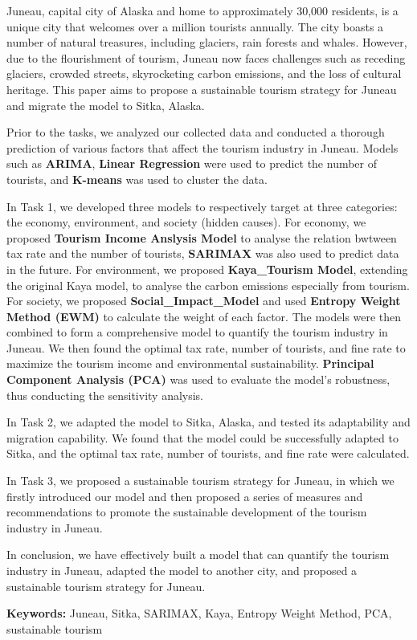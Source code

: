 \begin{summary}
    Juneau, capital city of Alaska and home to approximately 30,000 residents, 
    is a unique city that welcomes over a million tourists annually. 
    The city boasts a number of natural treasures, including glaciers, 
    rain forests and whales. However, due to the flourishment of tourism, 
    Juneau now faces challenges such as receding glaciers, crowded streets,
    skyrocketing carbon emissions, and the loss of cultural heritage.
    This paper aims to propose a sustainable tourism strategy for Juneau and
    migrate the model to Sitka, Alaska. 

    Prior to the tasks, we analyzed our collected data and conducted a thorough 
    prediction of various factors that affect the tourism industry in Juneau.
    Models such as \textbf{ARIMA}, \textbf{Linear Regression} were used to predict
    the number of tourists, and \textbf{K-means} was used to cluster the data.

    In Task 1, we developed three models to respectively target at three categories: 
    the economy, environment, and society (hidden causes). For economy, we proposed 
    \textbf{Tourism Income Anslysis Model} to analyse the relation bwtween tax rate and 
    the number of tourists, \textbf{SARIMAX} was also used to predict data in the future. 
    For environment, we proposed \textbf{Kaya\_Tourism Model}, extending the original Kaya model,
    to analyse the carbon emissions especially from tourism. 
    For society, we proposed \textbf{Social\_Impact\_Model} and used \textbf{Entropy Weight Method (EWM)}
    to calculate the weight of each factor. 
    The models were then combined to form a comprehensive model to quantify the tourism industry in Juneau.
    We then found the optimal tax rate, number of tourists, and fine rate
    to maximize the tourism income and environmental sustainability. 
    \textbf{Principal Component Analysis (PCA)} was used to evaluate the model's robustness, thus
    conducting the sensitivity analysis.

    In Task 2, we adapted the model to Sitka, Alaska, and tested its adaptability and migration capability.
    We found that the model could be successfully adapted to Sitka, and the optimal tax rate, number of tourists, and fine rate were calculated.

    In Task 3, we proposed a sustainable tourism strategy for Juneau, in which we firstly introduced our
    model and then proposed a series of measures and recommendations to promote the 
    sustainable development of the tourism industry in Juneau.

    In conclusion, we have effectively built a model that can quantify the tourism industry in Juneau, adapted the model to another city, and proposed a sustainable tourism strategy for Juneau.

    \vspace{0.5cm}

    \textbf{Keywords:} Juneau, Sitka, SARIMAX, Kaya, Entropy Weight Method, PCA, sustainable tourism
\end{summary}
    